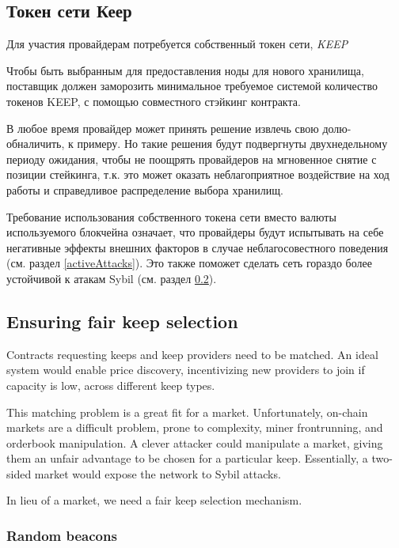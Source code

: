 \documentclass[11pt]{article}
\begin{document}
\subsection{Токен сети Кеер}

Для участия провайдерам потребуется собственный токен сети, 
 \textit{KEEP}

Чтобы быть выбранным для предоставления ноды для нового хранилища, 
поставщик должен заморозить минимальное требуемое системой 
количество токенов KEEP, с помощью совместного стэйкинг контракта.

В любое время провайдер может принять решение извлечь свою долю- 
обналичить, к примеру. Но такие решения будут подвергнуты 
двухнедельному периоду ожидания, чтобы не поощрять провайдеров 
на мгновенное снятие с позиции стейкинга, т.к. это может оказать 
неблагоприятное воздействие на ход работы и справедливое 
распределение выбора хранилищ.

Требование использования собственного токена сети вместо валюты 
используемого блокчейна означает, что провайдеры будут испытывать 
на себе негативные эффекты внешних факторов в случае 
неблагосовестного поведения (см. раздел \ref{activeAttacks}). 
Это также поможет сделать сеть гораздо более устойчивой к атакам 
Sybil (см. раздел \ref{fairKeepSelection}).

\subsection{Ensuring fair keep selection}
\label{fairKeepSelection}

Contracts requesting keeps and keep providers need to be matched. An
ideal system would enable price discovery, incentivizing new providers
to join if capacity is low, across different keep types.

This matching problem is a great fit for a market. Unfortunately,
on-chain markets are a difficult problem, prone to complexity, miner
frontrunning, and orderbook manipulation. A clever attacker could
manipulate a market, giving them an unfair advantage to be chosen for
a particular keep. Essentially, a two-sided market would expose the
network to Sybil attacks.

In lieu of a market, we need a fair keep selection mechanism.

\subsubsection{Random beacons}
\end{document}
